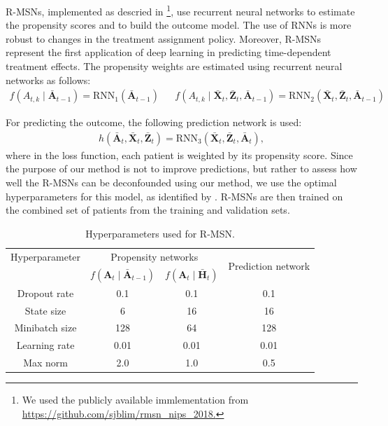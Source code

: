 \documentclass{article}
\newcommand{\vc}[1]{\mathbf{#1}}
\newcommand{\hist}[1]{\bar{\vc{#1}}}
\begin{document}
	R-MSNs, implemented as descried in \citet{lim2018forecasting}\footnote{We used the publicly available immlementation from \url{https://github.com/sjblim/rmsn_nips_2018.}}, use  recurrent neural networks to estimate the propensity scores and to build the outcome model. The use of RNNs is more robust to changes in the treatment assignment policy. Moreover, R-MSNs represent the first application of deep learning in predicting time-dependent treatment effects. The propensity weights are estimated using recurrent neural networks as follows:
	\begin{align}
	f(A_{t,k} \mid \hist{A}_{t-1}) = \text{RNN}_1(\hist{A}_{t-1}) && f(A_{t,k} \mid  \hist{X}_{t}, \hist{Z}_t, \hist{A}_{t-1}) = \text{RNN}_2(\hist{X}_{t}, \hist{Z}_t, \hist{A}_{t-1})
	\end{align}
	
	For predicting the outcome, the following prediction network is used:
	\begin{eqnarray}
	h(\hist{A}_t, \hist{X}_t, \hist{Z}_t) =  \text{RNN}_3(\hist{X}_{t}, \hist{Z}_t, \hist{A}_{t}),
	\end{eqnarray}
	where in the loss function, each patient is weighted by its propensity score. Since the purpose of our method is not to improve predictions, but rather to assess how well the R-MSNs can be deconfounded using our method, we use the optimal hyperparameters for this model, as identified by \citet{lim2018forecasting}. R-MSNs are then trained on the combined set of patients from the training and validation sets. 
	
	\begin{table}[h]
		\caption{Hyperparameters used for R-MSN.}
		\label{tab:hyperparameters_rmsn}
		\vskip 0.15in
		\begin{center}
			\begin{small}
				\begin{tabular}{c|ccc}
					\toprule
					Hyperparameter & \multicolumn{2}{c}{Propensity networks}  & \multirow{2}{1.1cm}{Prediction network} \\
					& $f(\vc{A}_t\mid \hist{A}_{t-1})$ & $f(\vc{A}_t\mid \hist{H}_{t})$ &   \\
					\hline
					Dropout rate &    0.1 & 0.1 & 0.1    \\
					State size & 6 & 16 & 16  \\
					Minibatch size & 128 & 64 & 128  \\
					Learning rate & 0.01 & 0.01 & 0.01 \\
					Max norm & 2.0 & 1.0 & 0.5 \\
					\bottomrule
				\end{tabular}
			\end{small}
		\end{center}
		\vskip -0.1in
	\end{table}
	
\end{document}
